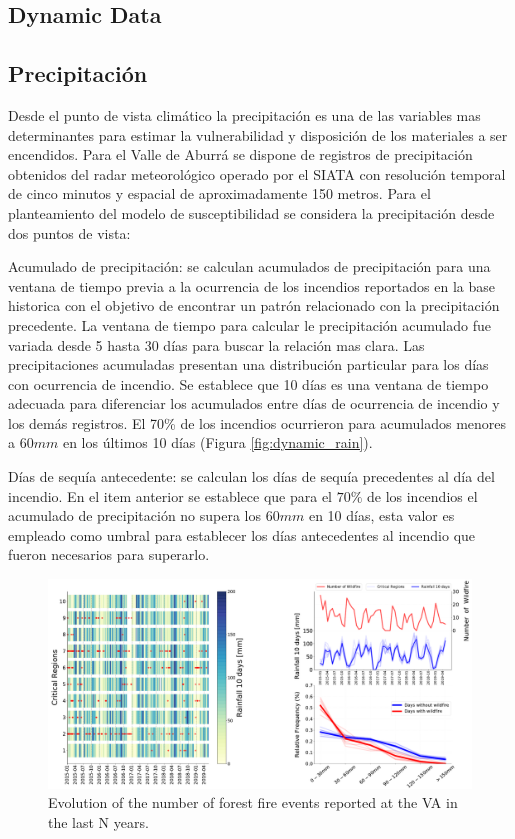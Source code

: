 \subsection{Dynamic Data}

\subsection*{Precipitación}

Desde el punto de vista climático la precipitación es una de las variables mas determinantes para estimar la vulnerabilidad y disposición de los materiales a ser encendidos. Para el Valle de Aburrá se dispone de registros de precipitación obtenidos del radar meteorológico operado por el SIATA con resolución temporal de cinco minutos y espacial de aproximadamente 150 metros. Para el planteamiento del modelo de susceptibilidad se considera la precipitación desde dos puntos de vista:

Acumulado de precipitación: se calculan acumulados de precipitación para una ventana de tiempo previa a la ocurrencia de los incendios reportados en la base historica con el objetivo de encontrar un patrón relacionado con la precipitación precedente. La ventana de tiempo para calcular le precipitación acumulado fue variada desde 5 hasta 30 días para buscar la relación mas clara. Las precipitaciones acumuladas presentan una distribución particular para los días con ocurrencia de incendio. Se establece que 10 días es una ventana de tiempo adecuada para diferenciar los acumulados entre días de ocurrencia de incendio y los demás registros. El 70\% de los incendios ocurrieron para acumulados menores a  $60mm$  en los últimos 10 días (Figura \ref{fig:dynamic_rain}).

Días de sequía antecedente: se calculan los días de sequía precedentes al día del incendio. En el item anterior se establece que para el  $70\%$ de los incendios el acumulado de precipitación no supera los  $60mm$  en 10 días, esta valor es empleado como umbral para establecer los días antecedentes al incendio que fueron necesarios para superarlo.

\begin{figure}
\centering
\includegraphics[width=18.cm]{Figuras/rain_composition.pdf}
\caption{Evolution of the number of forest fire events reported at the VA in the last N years.}
\label{fig:dynamic_rain1}
\end{figure}

